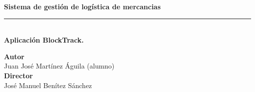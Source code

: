 \begin{titlepage}
 
 
\setlength{\centeroffset}{-0.5\oddsidemargin}
\addtolength{\centeroffset}{0.5\evensidemargin}
\thispagestyle{empty}

\noindent\hspace*{\centeroffset}\begin{minipage}{\textwidth}

\centering

% 

 \vspace{3.3cm}



{\Huge\bfseries Sistema de gestión de logística de mercancias\\
}
\noindent\rule[-1ex]{\textwidth}{3pt}\\[3.5ex]
{\large\bfseries Aplicación BlockTrack.\\[4cm]}
\end{minipage}

\vspace{2.5cm}
\noindent\hspace*{\centeroffset}\begin{minipage}{\textwidth}
\centering

\textbf{Autor}\\ {Juan José Martínez Águila (alumno)}\\[2.5ex]
\textbf{Director}\\
{José Manuel Benítez Sánchez}\\[2cm]
\end{minipage}

 
\end{titlepage}


